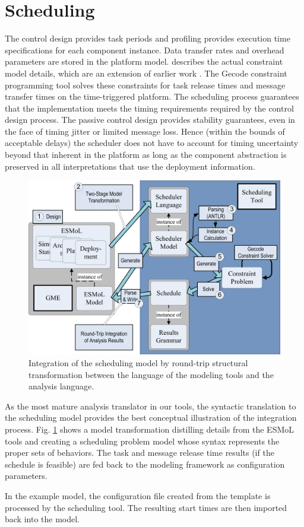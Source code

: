 \section{Scheduling}

The control design provides task periods and profiling provides execution time specifications for
each component instance.  Data transfer rates and overhead parameters are stored
in the platform model. \cite{sched:analysis}
describes the actual constraint model details, which are an extension of earlier
work \cite{sched:offline}. The Gecode constraint programming
tool \cite{tools:gecode} solves these constraints for task release times and
message transfer times on the time-triggered platform. The scheduling process
guarantees that the implementation meets the timing requirements required by the
control design process.  The passive control design provides stability
guarantees, even in the face of timing jitter or limited message loss.  Hence
(within the bounds of acceptable delays) the scheduler does not have to account
for timing uncertainty beyond that inherent in the platform as long as the
component abstraction is preserved in all interpretations that use the
deployment information.

\begin{figure}
\centering
\includegraphics[width=0.85\columnwidth]{figures/sched_integration.png}
    \caption{Integration of the scheduling model by round-trip structural transformation between the language 
of the modeling tools and the analysis language.}
    \label{fig:sched_int}
\end{figure}

As the most mature analysis translator in our tools, the syntactic translation to the scheduling model 
provides the best conceptual illustration of the integration process.  Fig. \ref{fig:sched_int} shows a 
model transformation distilling details from the ESMoL tools and creating a scheduling problem model whose 
syntax represents the proper sets of behaviors.  The task and message release time results (if the schedule 
is feasible) are fed back to the modeling framework as configuration parameters.

In the example model, the configuration file created from the template is processed 
by the scheduling tool.  The resulting start times are then imported back into the
model.